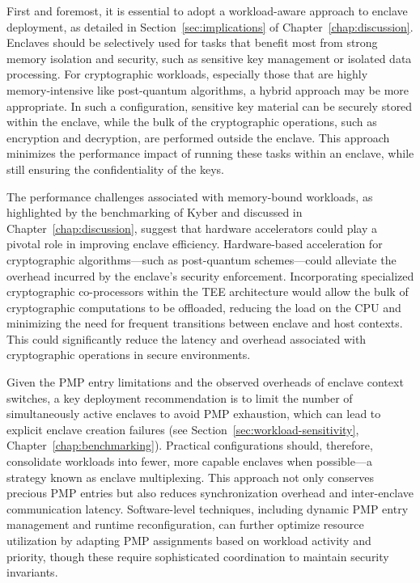 First and foremost, it is essential to adopt a workload-aware approach to enclave deployment, as detailed in Section~\ref{sec:implications} of Chapter~\ref{chap:discussion}. Enclaves should be selectively used for tasks that benefit most from strong memory isolation and security, such as sensitive key management or isolated data processing. For cryptographic workloads, especially those that are highly memory-intensive like post-quantum algorithms, a hybrid approach may be more appropriate. In such a configuration, sensitive key material can be securely stored within the enclave, while the bulk of the cryptographic operations, such as encryption and decryption, are performed outside the enclave. This approach minimizes the performance impact of running these tasks within an enclave, while still ensuring the confidentiality of the keys.

The performance challenges associated with memory-bound workloads, as highlighted by the benchmarking of Kyber and discussed in Chapter~\ref{chap:discussion}, suggest that hardware accelerators could play a pivotal role in improving enclave efficiency. Hardware-based acceleration for cryptographic algorithms—such as post-quantum schemes—could alleviate the overhead incurred by the enclave’s security enforcement. Incorporating specialized cryptographic co-processors within the TEE architecture would allow the bulk of cryptographic computations to be offloaded, reducing the load on the CPU and minimizing the need for frequent transitions between enclave and host contexts. This could significantly reduce the latency and overhead associated with cryptographic operations in secure environments.

Given the PMP entry limitations and the observed overheads of enclave context switches, a key deployment recommendation is to limit the number of simultaneously active enclaves to avoid PMP exhaustion, which can lead to explicit enclave creation failures (see Section~\ref{sec:workload-sensitivity}, Chapter~\ref{chap:benchmarking}). Practical configurations should, therefore, consolidate workloads into fewer, more capable enclaves when possible—a strategy known as enclave multiplexing. This approach not only conserves precious PMP entries but also reduces synchronization overhead and inter-enclave communication latency. Software-level techniques, including dynamic PMP entry management and runtime reconfiguration, can further optimize resource utilization by adapting PMP assignments based on workload activity and priority, though these require sophisticated coordination to maintain security invariants.

